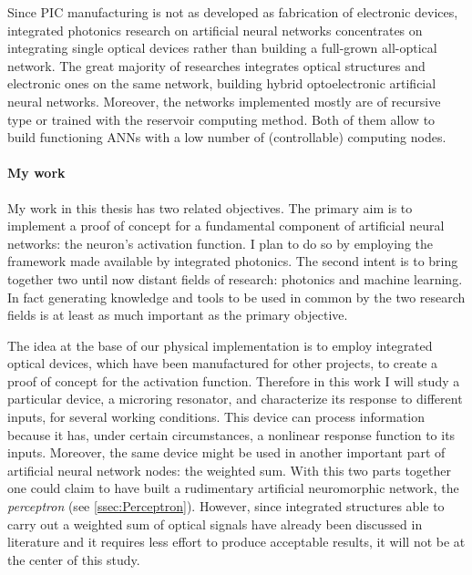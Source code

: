 Since \acs{PIC} manufacturing is not as developed as fabrication of electronic devices, integrated photonics research on artificial neural networks concentrates on integrating single optical devices rather than building a full-grown all-optical network.
The great majority of researches integrates optical structures and electronic ones on the same network, building hybrid optoelectronic artificial neural networks.
Moreover, the networks implemented mostly are of recursive type or trained with the reservoir computing method.
Both of them allow to build functioning \acp{ANN} with a low number of (controllable) computing nodes.

\paragraph{My work\\}
My work in this thesis has two related objectives.
The primary aim is to implement a proof of concept for a fundamental component of artificial neural networks: the neuron's activation function.
I plan to do so by employing the framework made available by integrated photonics.
The second intent is to bring together two until now distant fields of research: %
photonics and machine learning.
In fact generating knowledge and tools to be used in common by the two research fields is at least as much important as the primary objective.

The idea at the base of our physical implementation is to employ integrated optical devices, which have been manufactured for other projects, to create a proof of concept for the activation function.
Therefore in this work I will study a particular device, a microring resonator, and characterize its response to different inputs, for several working conditions.
This device can process information because it has, under certain circumstances, a nonlinear response function to its inputs.
Moreover, the same device might be used in another important part of artificial neural network nodes: the weighted sum.
With this two parts together one could claim to have built a rudimentary artificial neuromorphic network, the \textit{perceptron} (see \autoref{ssec:Perceptron}).
However, since integrated structures able to carry out a weighted sum of optical signals have already been discussed in literature and it requires less effort to produce acceptable results, it will not be at the center of this study.

